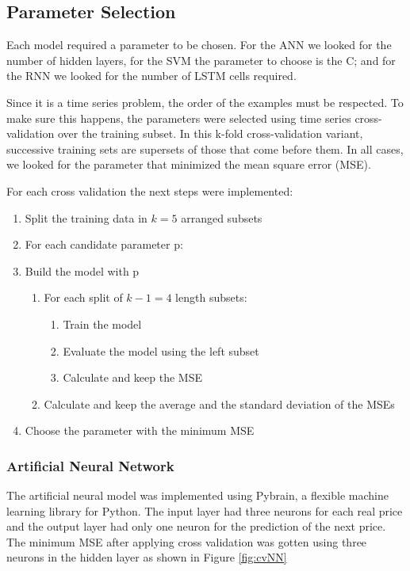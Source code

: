 \subsection{Parameter Selection}

Each model required a parameter to be chosen. For the ANN we looked for the number of hidden layers, for the SVM the parameter to choose is the C; and for the RNN we looked for the number of LSTM cells required.

Since it is a time series problem, the order of the examples must be respected. To make sure this happens, the parameters were selected using time series cross-validation over the training subset. In this k-fold cross-validation variant, successive training sets are supersets of those that come before them. In all cases, we looked for the parameter that minimized the mean square error (MSE). 

For each cross validation the next steps were implemented:
\begin{enumerate}
\item Split the training data in $k=5$ arranged subsets
\item For each candidate parameter p:
\item  Build the model with p
\begin{enumerate}
\item For each split of $k-1=4$ length subsets:
\begin{enumerate}
\item Train the model
\item Evaluate the model using the left subset
\item Calculate and keep the MSE
\end{enumerate}
\item Calculate and keep the average and the standard deviation of the MSEs
\end{enumerate}
\item Choose the parameter with the minimum MSE
\end{enumerate}

\subsubsection{Artificial Neural Network}

The artificial neural model was implemented using Pybrain, a flexible machine learning library for Python. The input layer had three neurons for each real price and the output layer had only one neuron for the prediction of the next price. The minimum MSE after applying cross validation was gotten using three neurons in the hidden layer as shown in  Figure \ref{fig:cvNN}

